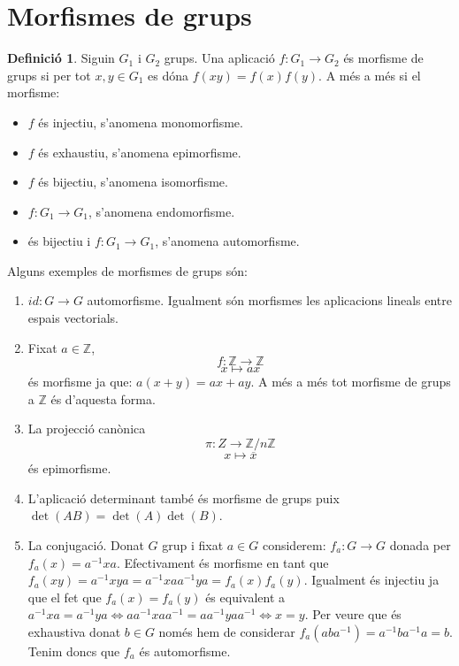 \documentclass[a4paper,11pt]{report}
\newcommand{\inv}[1]{#1^{-1}}
\renewcommand{\bar}{\overline}
\theoremstyle{theorem}
\theoremstyle{definition}
\newtheorem{definicio}{\normalfont\sffamily\bfseries Definició}[section]
\begin{document}
\section{Morfismes de grups}
\begin{definicio}
Siguin $G_1$ i $G_2$ grups. Una aplicació $f:G_1\longrightarrow G_2$ és morfisme de grups si per tot $x,y\in G_1$ es dóna $f(xy)=f(x)f(y)$. A més a més si el morfisme:
\begin{itemize}
	\item $f$ és injectiu, s'anomena monomorfisme.
	\item $f$ és exhaustiu, s'anomena epimorfisme.
	\item $f$ és bijectiu, s'anomena isomorfisme.
	\item $f:G_1\longrightarrow G_1$, s'anomena endomorfisme.
	\item és bijectiu i $f:G_1\longrightarrow G_1$, s'anomena automorfisme.
\end{itemize}
\end{definicio}
Alguns exemples de morfismes de grups són:
\begin{enumerate}
	\item $id:G\longrightarrow G$ automorfisme. Igualment són morfismes les aplicacions lineals entre espais vectorials.
	\item Fixat $a\in\mathbb{Z}$, $$f:\mathbb{Z}\longrightarrow\mathbb{Z}$$ $$x\longmapsto ax$$ és morfisme ja que: $a(x+y)=ax+ay$. A més a més tot morfisme de grups a $\mathbb{Z}$ és d'aquesta forma.
	\item La projecció canònica $$\pi:Z\longrightarrow\mathbb{Z}/n\mathbb{Z}$$ $$x\longmapsto\bar{x} $$ és epimorfisme.
	\item L'aplicació determinant també és morfisme de grups puix $\det(AB)=\det(A)\det(B)$.
	\item La conjugació. Donat $G$ grup i fixat $a\in G$ considerem:
	$f_a:G\longrightarrow G$
	donada per $f_a(x)=\inv{a}xa$. Efectivament és morfisme en tant que $f_a(xy)=\inv{a}xya=\inv{a}xa\inv{a}ya=f_a(x)f_a(y)$. Igualment és injectiu ja que el fet que $f_a(x)=f_a(y)$ és equivalent a $\inv{a}xa=\inv{a}ya\Leftrightarrow a\inv{a}xa\inv{a}=a\inv{a}ya\inv{a}\Leftrightarrow x=y$. Per veure que és exhaustiva donat $b\in G$ només hem de considerar $f_a(ab\inv{a})=\inv{a}b\inv{a}a=b$. Tenim doncs que $f_a$ és automorfisme.
\end{enumerate}
\end{document}
